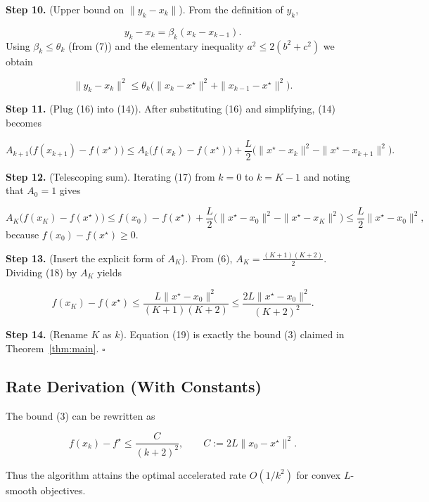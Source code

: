 \documentclass{article}
\begin{document}
\noindent\textbf{Step 10.} (Upper bound on \(\|y_k-x_k\|\)).  
From the definition of \(y_k\),

\[
y_k-x_k = \beta_k(x_k-x_{k-1}) .
\]
Using \(\beta_k\le\theta_k\) (from (7)) and the elementary inequality
\(a^2\le 2(b^2+c^2)\) we obtain  

\[
\|y_k-x_k\|^{2}\le \theta_k\bigl(\|x_k-x^\star\|^{2}
                +\|x_{k-1}-x^\star\|^{2}\bigr).
\tag{16}
\]

\noindent\textbf{Step 11.} (Plug (16) into (14)).  
After substituting (16) and simplifying, (14) becomes

\[
A_{k+1}\bigl(f(x_{k+1})-f(x^\star)\bigr)
\le A_k\bigl(f(x_k)-f(x^\star)\bigr)
    +\frac{L}{2}\bigl(\|x^\star-x_k\|^{2}-\|x^\star-x_{k+1}\|^{2}\bigr).
\tag{17}
\]

\noindent\textbf{Step 12.} (Telescoping sum).  
Iterating (17) from \(k=0\) to \(k=K-1\) and noting that \(A_0=1\) gives

\[
A_K\bigl(f(x_K)-f(x^\star)\bigr)
\le f(x_0)-f(x^\star)+\frac{L}{2}\bigl(\|x^\star-x_0\|^{2}-\|x^\star-x_{K}\|^{2}\bigr)
\le \frac{L}{2}\|x^\star-x_0\|^{2},
\tag{18}
\]
because \(f(x_0)-f(x^\star)\ge0\).

\noindent\textbf{Step 13.} (Insert the explicit form of \(A_K\)).  
From (6), \(A_K=\frac{(K+1)(K+2)}{2}\). Dividing (18) by \(A_K\) yields

\[
f(x_K)-f(x^\star)\le
\frac{L\|x^\star-x_0\|^{2}}{(K+1)(K+2)}
\le \frac{2L\|x^\star-x_0\|^{2}}{(K+2)^{2}} .
\tag{19}
\]

\noindent\textbf{Step 14.} (Rename \(K\) as \(k\)).  
Equation (19) is exactly the bound (3) claimed in Theorem~\ref{thm:main}. \(\square\)

\subsection*{Rate Derivation (With Constants)}
The bound (3) can be rewritten as  

\[
f(x_k)-f^\star \le \frac{C}{(k+2)^2},
\qquad C:=2L\|x_0-x^\star\|^{2}.
\]

Thus the algorithm attains the optimal accelerated rate \(O(1/k^{2})\) for convex \(L\)-smooth objectives.
\end{document}
